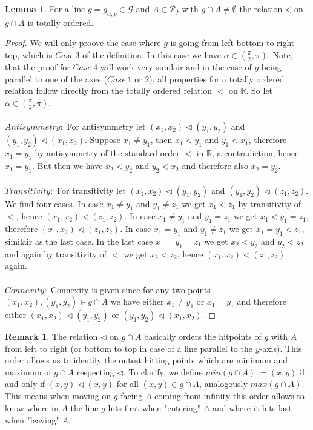 \documentclass[12pt,a4paper]{scrartcl}
\numberwithin{equation}{subsection}
\newcommand{\1}{\mathbbm{1}}
\newcommand{\G}{\mathcal{G}}
\numberwithin{equation}{section}
\theoremstyle{definition}
\newtheorem{lemma}{Lemma}[subsection]
\newtheorem{remark}{Remark}[subsection]
\begin{document}
\begin{lemma}
For a line $g=g_{\alpha,p}\in\G$ and $A\in \mathcal{P}_f$ with $g\cap A\neq \emptyset$ the relation $\triangleleft$ on $g\cap A$ is totally ordered. 
	\begin{proof}
		We will only proove the case where $g$ is going from left-bottom to right-top, which is $\mathit{Case}\ 3$ of the definition. In this case we have $\alpha\in (\frac{\pi}{2},\pi)$. Note, that the proof for $\mathit{Case\ }4$ will work very similair and in the case of $g$ being parallel to one of the axes ($\mathit{Case\ }1$ or $2$), all properties for a totally ordered relation follow directly from the totally ordered relation $<$ on $\mathbb{R}$. So let $\alpha\in (\frac{\pi}{2},\pi)$. \\
		\\
		$\mathit{Antisymmetry:}$ For antisymmetry let $(x_1, x_2) \triangleleft (y_1, y_2)$ and $(y_1, y_2) \triangleleft (x_1, x_2)$. Suppose $x_1\neq y_1$, then $x_1 < y_1$ and $y_1 < x_1$, therefore $x_1 = y_1$ by antisymmetry of the standard order $<$ in $\mathbb{R}$, a contradiction, hence $x_1 = y_1$. But then we have $x_2 < y_2$ and $y_2 < x_2$ and therefore also $x_2 = y_2$. \\
		\\
		$\mathit{Transitivity:}$ For transitivity let $(x_1,x_2) \triangleleft (y_1,y_2)$ and $(y_1,y_2) \triangleleft (z_1,z_2)$. We find four cases. In case $x_1 \neq y_1$ and $y_1 \neq z_1$ we get $x_1 < z_1$ by transitivity of $<$, hence $(x_1,x_2) \triangleleft (z_1,z_2)$. In case $x_1\neq y_1$ and $y_1 = z_1$ we get $x_1 < y_1 = z_1$, therefore $(x_1,x_2) \triangleleft (z_1,z_2)$. In case $x_1 = y_1$ and $y_1 \neq z_1$ we get $x_1 = y_1 < z_1$, similair as the last case. In the last case $x_1 = y_1 = z_1$ we get $x_2 < y_2$ and $y_2 < z_2$ and again by transitivity of $<$ we get $x_2 < z_2$, hence $(x_1,x_2) \triangleleft (z_1,z_2)$ again. \\
		\\
		$\mathit{Connexity:}$ Connexity is given since for any two points $(x_1,x_2),(y_1,y_2)\in g\cap A$ we have either $x_1 \neq y_1$ or $x_1 = y_1$ and therefore either $(x_1,x_2)\triangleleft(y_1,y_2)$ or $(y_1,y_2)\triangleleft(x_1,x_2)$.
	 
	\end{proof}
\end{lemma}

\begin{remark}
	The relation $\triangleleft$ on $g\cap A$ basically orders the hitpoints of $g$ with $A$ from left to right (or bottom to top in case of a line parallel to the $y$-axis). This order allows us to identify the outest hitting points which are minimum and maximum of $g\cap A$ respecting $\triangleleft$. To clarify, we define $min (g\cap A) := (x,y)$ if and only if $(x,y) \triangleleft (\tilde x,\tilde y)$ for all $(\tilde x, \tilde y)\in g\cap A$, analogously $max(g\cap A)$. This means when moving on $g$ facing $A$ coming from infinity this order allows to know where in $A$ the line $g$ hits first when "entering" $A$ and where it hits last when "leaving" $A$. 
\end{remark}
\end{document}
